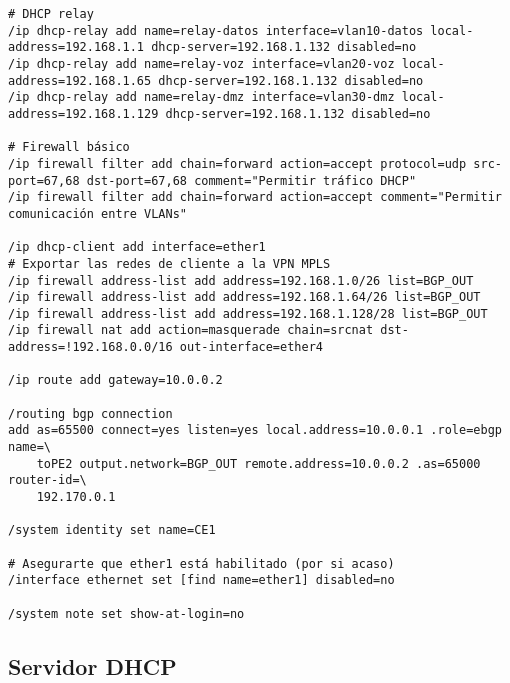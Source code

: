 \begin{lstlisting}[language=RouterOS]
# DHCP relay
/ip dhcp-relay add name=relay-datos interface=vlan10-datos local-address=192.168.1.1 dhcp-server=192.168.1.132 disabled=no
/ip dhcp-relay add name=relay-voz interface=vlan20-voz local-address=192.168.1.65 dhcp-server=192.168.1.132 disabled=no
/ip dhcp-relay add name=relay-dmz interface=vlan30-dmz local-address=192.168.1.129 dhcp-server=192.168.1.132 disabled=no

# Firewall básico
/ip firewall filter add chain=forward action=accept protocol=udp src-port=67,68 dst-port=67,68 comment="Permitir tráfico DHCP"
/ip firewall filter add chain=forward action=accept comment="Permitir comunicación entre VLANs"

/ip dhcp-client add interface=ether1
# Exportar las redes de cliente a la VPN MPLS
/ip firewall address-list add address=192.168.1.0/26 list=BGP_OUT
/ip firewall address-list add address=192.168.1.64/26 list=BGP_OUT
/ip firewall address-list add address=192.168.1.128/28 list=BGP_OUT
/ip firewall nat add action=masquerade chain=srcnat dst-address=!192.168.0.0/16 out-interface=ether4

/ip route add gateway=10.0.0.2

/routing bgp connection
add as=65500 connect=yes listen=yes local.address=10.0.0.1 .role=ebgp name=\
    toPE2 output.network=BGP_OUT remote.address=10.0.0.2 .as=65000 router-id=\
    192.170.0.1

/system identity set name=CE1

# Asegurarte que ether1 está habilitado (por si acaso)
/interface ethernet set [find name=ether1] disabled=no

/system note set show-at-login=no
\end{lstlisting}

\subsection{Servidor DHCP}
\label{Apendice2:configuracion_dhcp_red_completa}
